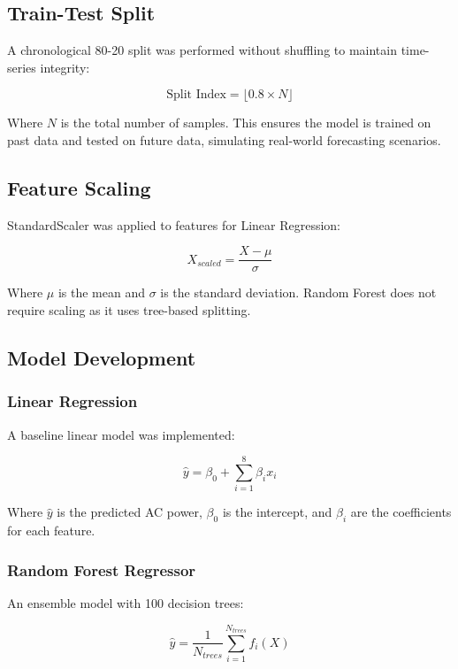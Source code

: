\documentclass[12pt,a4paper]{article}
\begin{document}
\subsection{Train-Test Split}
A chronological 80-20 split was performed without shuffling to maintain time-series integrity:

\begin{equation}
\text{Split Index} = \lfloor 0.8 \times N \rfloor
\end{equation}

Where $N$ is the total number of samples. This ensures the model is trained on past data and tested on future data, simulating real-world forecasting scenarios.

\subsection{Feature Scaling}
StandardScaler was applied to features for Linear Regression:

\begin{equation}
X_{scaled} = \frac{X - \mu}{\sigma}
\end{equation}

Where $\mu$ is the mean and $\sigma$ is the standard deviation. Random Forest does not require scaling as it uses tree-based splitting.

\subsection{Model Development}

\subsubsection{Linear Regression}
A baseline linear model was implemented:

\begin{equation}
\hat{y} = \beta_0 + \sum_{i=1}^{8} \beta_i x_i
\end{equation}

Where $\hat{y}$ is the predicted AC power, $\beta_0$ is the intercept, and $\beta_i$ are the coefficients for each feature.

\subsubsection{Random Forest Regressor}
An ensemble model with 100 decision trees:

\begin{equation}
\hat{y} = \frac{1}{N_{trees}}\sum_{i=1}^{N_{trees}} f_i(X)
\end{equation}
\end{document}
